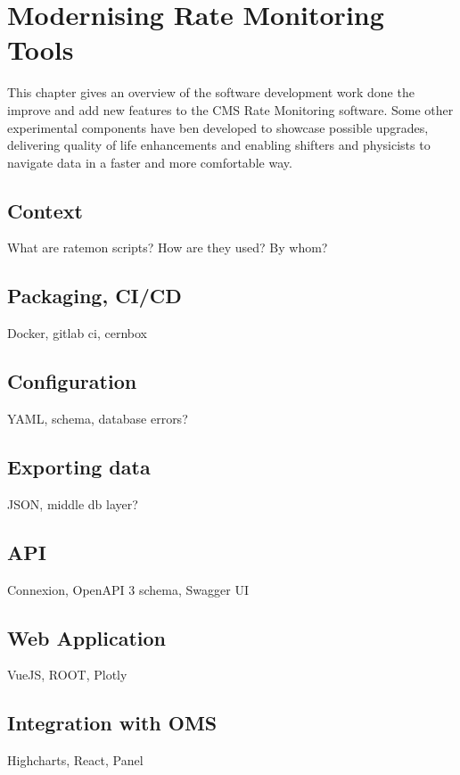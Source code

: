 \chapter{Modernising Rate Monitoring Tools}

This chapter gives an overview of the software development work done the improve and add new features to the CMS Rate Monitoring software. Some other experimental components have ben developed to showcase possible upgrades, delivering quality of life enhancements and enabling shifters and physicists to navigate data in a faster and more comfortable way.

\section{Context}

What are ratemon scripts? How are they used? By whom?

\section{Packaging, CI/CD}

Docker, gitlab ci, cernbox

\section{Configuration}

YAML, schema, database errors?

\section{Exporting data}

JSON, middle db layer?

\section{API}

Connexion, OpenAPI 3 schema, Swagger UI

\section{Web Application}

VueJS, ROOT, Plotly

\section{Integration with OMS}

Highcharts, React, Panel